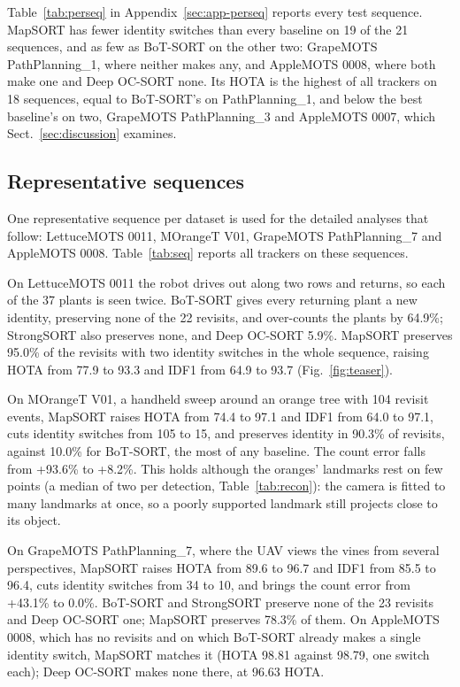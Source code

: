 \documentclass[pdflatex,sn-basic]{sn-jnl}%
\theoremstyle{thmstyleone}%
\begin{document}
Table~\ref{tab:perseq} in Appendix~\ref{sec:app-perseq} reports every test sequence. MapSORT has fewer identity switches than every baseline on 19 of the 21 sequences, and as few as BoT-SORT on the other two: GrapeMOTS PathPlanning\_1, where neither makes any, and AppleMOTS 0008, where both make one and Deep OC-SORT none. Its HOTA is the highest of all trackers on 18 sequences, equal to BoT-SORT's on PathPlanning\_1, and below the best baseline's on two, GrapeMOTS PathPlanning\_3 and AppleMOTS 0007, which Sect.~\ref{sec:discussion} examines.

\subsection{Representative sequences}\label{sec:res-seq}

One representative sequence per dataset is used for the detailed analyses that follow: LettuceMOTS 0011, MOrangeT V01, GrapeMOTS PathPlanning\_7 and AppleMOTS 0008. Table~\ref{tab:seq} reports all trackers on these sequences.

On LettuceMOTS 0011 the robot drives out along two rows and returns, so each of the 37 plants is seen twice. BoT-SORT gives every returning plant a new identity, preserving none of the 22 revisits, and over-counts the plants by 64.9\%; StrongSORT also preserves none, and Deep OC-SORT 5.9\%. MapSORT preserves 95.0\% of the revisits with two identity switches in the whole sequence, raising HOTA from 77.9 to 93.3 and IDF1 from 64.9 to 93.7 (Fig.~\ref{fig:teaser}).

On MOrangeT V01, a handheld sweep around an orange tree with 104 revisit events, MapSORT raises HOTA from 74.4 to 97.1 and IDF1 from 64.0 to 97.1, cuts identity switches from 105 to 15, and preserves identity in 90.3\% of revisits, against 10.0\% for BoT-SORT, the most of any baseline. The count error falls from +93.6\% to +8.2\%. This holds although the oranges' landmarks rest on few points (a median of two per detection, Table~\ref{tab:recon}): the camera is fitted to many landmarks at once, so a poorly supported landmark still projects close to its object.

On GrapeMOTS PathPlanning\_7, where the UAV views the vines from several perspectives, MapSORT raises HOTA from 89.6 to 96.7 and IDF1 from 85.5 to 96.4, cuts identity switches from 34 to 10, and brings the count error from +43.1\% to 0.0\%. BoT-SORT and StrongSORT preserve none of the 23 revisits and Deep OC-SORT one; MapSORT preserves 78.3\% of them. On AppleMOTS 0008, which has no revisits and on which BoT-SORT already makes a single identity switch, MapSORT matches it (HOTA 98.81 against 98.79, one switch each); Deep OC-SORT makes none there, at 96.63 HOTA.
\end{document}
